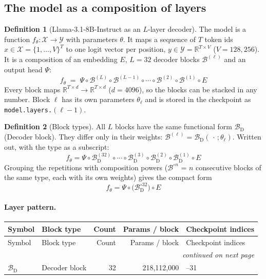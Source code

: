 \documentclass[10pt,a4paper]{article}
\theoremstyle{definition}
\newtheorem{definition}{Definition}[section]
\begin{document}
\subsection{The model as a composition of layers}\label{sec:comp}
\begin{definition}[Llama-3.1-8B-Instruct as an $L$-layer decoder]
The model is a function $f_\theta:\mathcal{X}\to\mathcal{Y}$ with parameters $\theta$. It maps a sequence of $T$ token ids $x\in\mathcal{X}=\{1,\dots,V\}^{T}$ to one logit vector per position, $y\in\mathcal{Y}=\mathbb{R}^{T\times V}$ ($V=128{,}256$). It is a composition of an embedding $E$, $L=32$ decoder blocks $\mathcal{B}^{(\ell)}$ and an output head $\Psi$:
\begin{equation}
  f_\theta \;=\; \Psi\circ\mathcal{B}^{(L)}\circ\mathcal{B}^{(L-1)}\circ\cdots\circ\mathcal{B}^{(2)}\circ\mathcal{B}^{(1)}\circ E
\end{equation}
Every block maps $\mathbb{R}^{T\times d}\to\mathbb{R}^{T\times d}$ ($d=4096$), so the blocks can be stacked in any number. Block $\ell$ has its own parameters $\theta_\ell$ and is stored in the checkpoint as \texttt{model.layers.}$(\ell-1)$.
\end{definition}
\begin{definition}[Block types]
All $L$ blocks have the same functional form $\mathcal{B}_{\mathrm{D}}$ (Decoder block). They differ only in their weights: $\mathcal{B}^{(\ell)}=\mathcal{B}_{\mathrm{D}}(\,\cdot\,;\theta_\ell)$.
Written out, with the type as a subscript:
\begin{equation}
  f_\theta = \Psi\circ \mathcal{B}^{(32)}_{\mathrm{D}}\circ \cdots\circ \mathcal{B}^{(3)}_{\mathrm{D}}\circ \mathcal{B}^{(2)}_{\mathrm{D}}\circ \mathcal{B}^{(1)}_{\mathrm{D}}\circ E
\end{equation}
Grouping the repetitions with composition powers ($\mathcal{B}^{\circ n}$ = $n$ consecutive blocks of the same type, each with its own weights) gives the compact form
\begin{equation}\label{eq:compact}
  f_\theta = \Psi\circ\Big(\mathcal{B}_{\mathrm{D}}^{\circ 32}\Big)\circ E
\end{equation}
\end{definition}
\paragraph{Layer pattern.}
\begin{longtable}{l>{\raggedright\arraybackslash}p{5.6cm}rr>{\raggedright\arraybackslash}p{4.4cm}}
\toprule
Symbol & Block type & Count & Params / block & Checkpoint indices \\
\midrule
\endfirsthead
\toprule
Symbol & Block type & Count & Params / block & Checkpoint indices \\
\midrule
\endhead
\midrule \multicolumn{5}{r}{\textit{continued on next page}} \\
\endfoot
\bottomrule
\endlastfoot
$\mathcal{B}_{\mathrm{D}}$ & Decoder block & 32 & 218,112,000 & 0--31 \\
\end{longtable}
\end{document}

